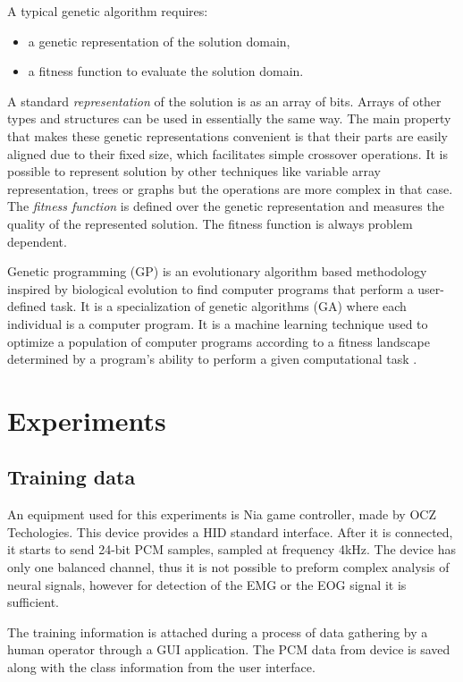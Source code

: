 \documentclass[a4paper]{IEEEtran}
\begin{document}
A typical genetic algorithm requires:
\begin{itemize}
	\item a genetic representation of the solution domain,
	\item a fitness function to evaluate the solution domain.
\end{itemize}
A standard \textit{representation} of the solution is as an array of bits. 
Arrays of other types and structures can be used in essentially the same way. 
The main property that makes these genetic representations convenient 
is that their parts are easily aligned due to their fixed size,
which facilitates simple crossover operations. It is possible to 
represent solution by other techniques like variable array representation,
trees or graphs but the operations are more complex in that case.
The \textit{fitness function} is defined over the genetic representation and
measures the quality of the represented solution. The fitness function 
is always problem dependent.

Genetic programming (GP) is an evolutionary algorithm based methodology 
inspired by biological evolution to find computer programs that perform 
a user-defined task. 
It is a specialization of genetic algorithms (GA) where each 
individual is a computer program. 
It is a machine learning technique used to optimize a population of 
computer programs according to a fitness landscape determined by a 
program's ability to perform a given computational task \cite{gawiki}.


\section{Experiments}
\label{sec:ex}
\subsection{Training data} 
\label{sec:ex_train_data}
An equipment used for this experiments is {Nia game controller}, made by 
{OCZ Techologies}. This device provides a HID standard interface.
After it is connected, it starts to send 24-bit PCM samples, 
sampled at frequency 4kHz. The device has only one balanced channel, thus 
it is not possible to preform complex analysis of neural signals,
however for detection of the EMG or the EOG signal it is sufficient.

The training information is attached during a process of data gathering by a human operator 
through a GUI application.
The PCM data from device is saved along with the class information from the
user interface.
\end{document}
